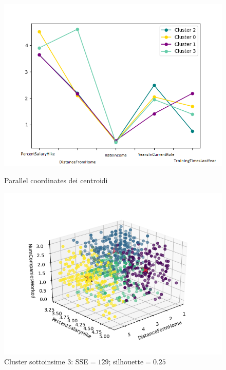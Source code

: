 \documentclass[english]{article}
\begin{document}
\begin{figure}[H]
\begin{minipage}[b]{0.47\textwidth}
\centering
\includegraphics[width=\textwidth]{parr_corr4.png}
\caption{Parallel coordinates dei centroidi}
\label{etichetta1}
\end{minipage}
\hfill
\begin{minipage}[b]{0.55\textwidth}
\includegraphics[scale=0.6]{Percent_distance_numcompanie4.png}
\caption{Cluster sottoinsime 3: SSE$=129$; silhouette$=0.25$}
\label{etichetta2}
\end{minipage}
\end{figure}
\end{document}

